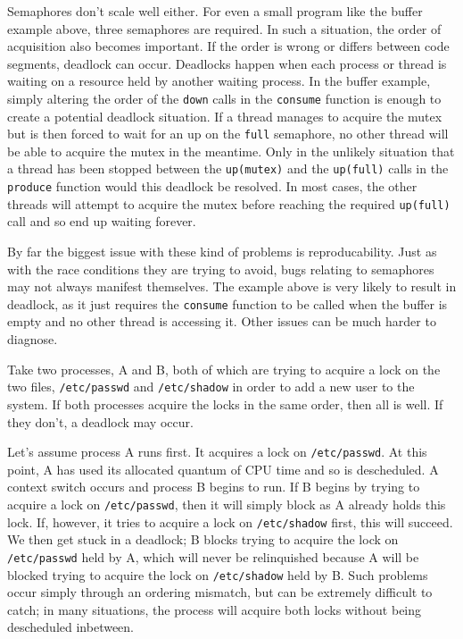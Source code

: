 Semaphores don't scale well either.  For even a small program like the
buffer example above, three semaphores are required.  In such a
situation, the order of acquisition also becomes important.  If the
order is wrong or differs between code segments, deadlock can occur.
Deadlocks happen when each process or thread is waiting on a resource
held by another waiting process.  In the buffer example, simply
altering the order of the \texttt{down} calls in the \texttt{consume}
function is enough to create a potential deadlock situation.  If a
thread manages to acquire the mutex but is then forced to wait for an
up on the \texttt{full} semaphore, no other thread will be able to
acquire the mutex in the meantime.  Only in the unlikely situation
that a thread has been stopped between the \texttt{up(mutex)} and the
\texttt{up(full)} calls in the \texttt{produce} function would this
deadlock be resolved.  In most cases, the other threads will attempt
to acquire the mutex before reaching the required \texttt{up(full)}
call and so end up waiting forever.

By far the biggest issue with these kind of problems is
reproducability.  Just as with the race conditions they are trying to
avoid, bugs relating to semaphores may not always manifest themselves.
The example above is very likely to result in deadlock, as it just
requires the \texttt{consume} function to be called when the buffer is
empty and no other thread is accessing it.  Other issues can be much
harder to diagnose.

Take two processes, A and B, both of which are trying to acquire a
lock on the two files, \texttt{/etc/passwd} and \texttt{/etc/shadow}
in order to add a new user to the system.  If both processes acquire
the locks in the same order, then all is well.  If they don't, a
deadlock may occur.

Let's assume process A runs first.  It acquires a lock on
\texttt{/etc/passwd}.  At this point, A has used its allocated quantum
of CPU time and so is descheduled.  A context switch occurs and
process B begins to run.  If B begins by trying to acquire a lock on
\texttt{/etc/passwd}, then it will simply block as A already holds
this lock.  If, however, it tries to acquire a lock on
\texttt{/etc/shadow} first, this will succeed.  We then get stuck in a
deadlock; B blocks trying to acquire the lock on \texttt{/etc/passwd}
held by A, which will never be relinquished because A will be blocked
trying to acquire the lock on \texttt{/etc/shadow} held by B.  Such
problems occur simply through an ordering mismatch, but can be
extremely difficult to catch; in many situations, the process will
acquire both locks without being descheduled inbetween.

